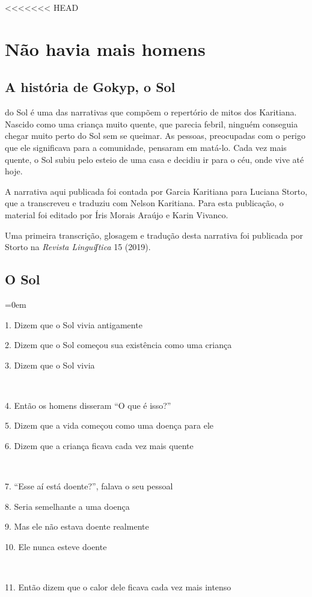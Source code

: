 <<<<<<< HEAD
\part{Não havia mais homens}

\chapter{A história de Gokyp, o Sol}

 do Sol é uma das narrativas que compõem o repertório de mitos
dos Karitiana. Nascido como uma criança muito quente, que parecia
febril, ninguém conseguia chegar muito perto do Sol sem se queimar. As
pessoas, preocupadas com o perigo que ele significava para a comunidade,
pensaram em matá-lo. Cada vez mais quente, o Sol subiu pelo esteio de
uma casa e decidiu ir para o céu, onde vive até hoje.

A narrativa aqui publicada foi contada por Garcia Karitiana para Luciana
Storto, que a transcreveu e traduziu com Nelson Karitiana. Para esta
publicação, o material foi editado por Íris Morais Araújo e Karin
Vivanco.

Uma primeira transcrição, glosagem e tradução desta narrativa foi
publicada por Storto na \emph{Revista Linguíʃtica} 15 (2019).

\chapter*{O Sol}
\begingroup\parindent=0em

1. Dizem que o Sol vivia antigamente

2. Dizem que o Sol começou sua existência como uma criança

3. Dizem que o Sol vivia

~

4. Então os homens disseram ``O que é isso?''

5. Dizem que a vida começou como uma doença para ele

6. Dizem que a criança ficava cada vez mais quente

~

7. ``Esse aí está doente?'', falava o seu pessoal

8. Seria semelhante a uma doença

9. Mas ele não estava doente realmente

10. Ele nunca esteve doente

~

11. Então dizem que o calor dele ficava cada vez mais intenso

